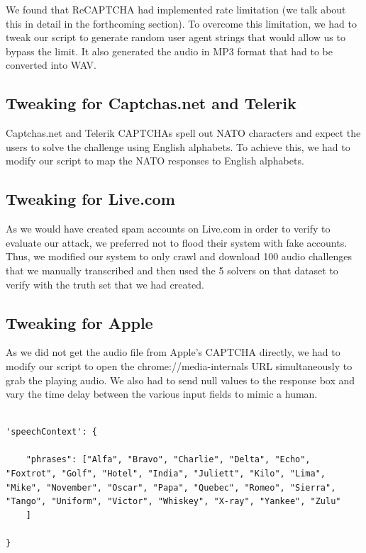 We found that ReCAPTCHA had implemented rate limitation (we talk about this in detail in the forthcoming section). To overcome this limitation, we had to tweak our script to generate random user agent strings that would allow us to bypass the limit. It also generated the audio in MP3 format that had to be converted into WAV. \newline

\subsection{Tweaking for Captchas.net and Telerik}
\label{sec:captchasnet}

Captchas.net and Telerik CAPTCHAs spell out NATO characters and expect the users to solve the challenge using English alphabets. To achieve this, we had to modify our script to map the NATO responses to English alphabets. \newline

\subsection{Tweaking for Live.com}
\label{sec:captchasnet}

As we would have created spam accounts on Live.com in order to verify to evaluate our attack, we preferred not to flood their system with fake accounts. Thus, we modified our system to only crawl and download 100 audio challenges that we manually transcribed and then used the 5 solvers on that dataset to verify with the truth set that we had created. \newline

\subsection{Tweaking for Apple}
\label{sec:captchasnet}

As we did not get the audio file from Apple's CAPTCHA directly, we had to modify our script to open the chrome://media-internals URL simultaneously to grab the playing audio. We also had to send null values to the response box and vary the time delay between the various input fields to mimic a human. \newline

\begin{lstlisting}[caption={Setting Expected Phrases in Google Speech API for Captchas.net solver}]

'speechContext': {

	"phrases": ["Alfa", "Bravo", "Charlie", "Delta", "Echo", "Foxtrot", "Golf", "Hotel", "India", "Juliett", "Kilo", "Lima", "Mike", "November", "Oscar", "Papa", "Quebec", "Romeo", "Sierra", "Tango", "Uniform", "Victor", "Whiskey", "X-ray", "Yankee", "Zulu"
	]

}
\end{lstlisting}
